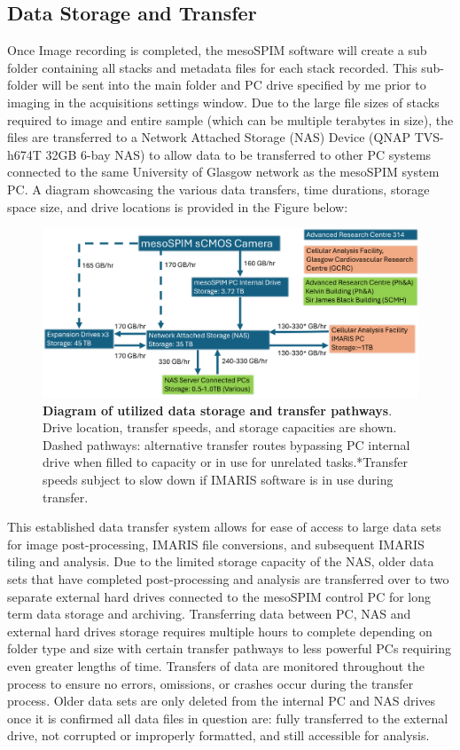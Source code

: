 \subsection{Data Storage and Transfer}
Once Image recording is completed, the mesoSPIM software will create a sub folder containing all stacks and metadata files for each stack recorded. This sub-folder will be sent into the main folder and PC drive specified by me prior to imaging in the acquisitions settings window. Due to the large file sizes of stacks required to image and entire sample (which can be multiple terabytes in size), the files are transferred to a Network Attached Storage (NAS) Device (QNAP TVS-h674T 32GB 6-bay NAS) to allow data to be transferred to other PC systems connected to the same University of Glasgow network as the mesoSPIM system PC.  A diagram showcasing the various data transfers, time durations, storage space size, and drive locations is provided in the Figure below:

\begin{figure}[H]
    \centering
    \includegraphics[width=0.95\linewidth]{Figures/Figure2.13TBC.png}
    \caption{\textbf{Diagram of utilized data storage and transfer pathways}. Drive location, transfer speeds, and storage capacities are shown. Dashed pathways: alternative transfer routes bypassing PC internal drive when filled to capacity or in use for unrelated tasks.*Transfer speeds subject to slow down if IMARIS software is in use during transfer.}
    \label{fig:enter-label}
\end{figure}

This established data transfer system allows for ease of access to large data sets for image post-processing, IMARIS file conversions, and subsequent IMARIS tiling and analysis. Due to the limited storage capacity of the NAS, older data sets that have completed post-processing and analysis are transferred over to two separate external hard drives connected to the mesoSPIM control PC for long term data storage and archiving. Transferring data between PC, NAS and external hard drives storage requires multiple hours to complete depending on folder type and size with certain transfer pathways to less powerful PCs requiring even greater lengths of time. Transfers of data are monitored throughout the process to ensure no errors, omissions, or crashes occur during the transfer process. Older data sets are only deleted from the internal PC and NAS drives once it is confirmed all data files in question are: fully transferred to the external drive, not corrupted or improperly formatted, and still accessible for analysis. 

